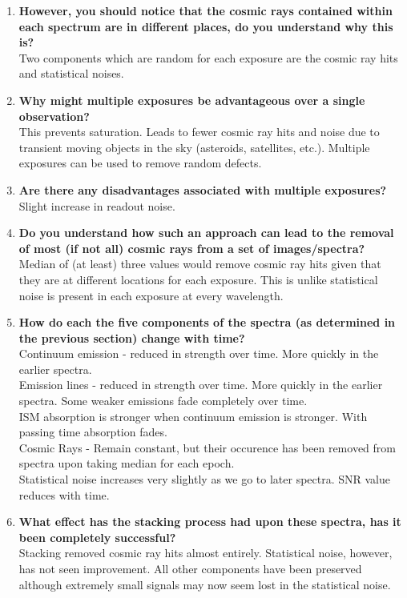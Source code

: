 \documentclass{article}
\begin{document}
\begin{enumerate}
		\item \textbf{However, you should notice that the cosmic rays contained within each spectrum are in different places, do you understand why this is?} \\
		Two components which are random for each exposure are the cosmic ray hits and statistical noises. 

		\item \textbf{Why might multiple exposures be advantageous over a single observation?} \\
		This prevents saturation. Leads to fewer cosmic ray hits and noise due to transient moving objects in the sky (asteroids, satellites, etc.). Multiple exposures can be used to remove random defects.

		\item \textbf{Are there any disadvantages associated with multiple exposures?} \\
		Slight increase in readout noise.

		\item \textbf{Do you understand how such an approach can lead to the removal of most (if not all) cosmic rays from a set of images/spectra?} \\
		Median of (at least) three values would remove cosmic ray hits given that they are at different locations for each exposure. This is unlike statistical noise is present in each exposure at every wavelength.

		\item \textbf{How do each the five components of the spectra (as determined in the previous section) change with time?} \\
		Continuum emission - reduced in strength over time. More quickly in the earlier spectra.\\
		Emission lines - reduced in strength over time. More quickly in the earlier spectra. Some weaker emissions fade completely over time. \\
		ISM absorption is stronger when continuum emission is stronger. With passing time absorption fades. \\
		Cosmic Rays - Remain constant, but their occurence has been removed from spectra upon taking median for each epoch. \\
		Statistical noise increases very slightly as we go to later spectra. SNR value reduces with time.

		\item \textbf{What effect has the stacking process had upon these spectra, has it been completely successful?} \\
		Stacking removed cosmic ray hits almost entirely. Statistical noise, however, has not seen improvement. All other components have been preserved although extremely small signals may now seem lost in the statistical noise.


\end{enumerate}
\end{document}
